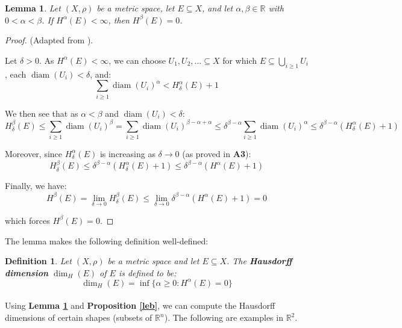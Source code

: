 \documentclass{article}[11pt]
\newcommand*{\R}{\mathbb{R}}
\DeclareMathOperator*{\diam}{diam}
\theoremstyle{dotless}
\newtheorem{lem}[thm]{Lemma}
\newtheorem{defn}[thm]{Definition}
\begin{document}
\begin{lem}\label{dim}
	Let $(X, \rho)$ be a metric space, let $E \subseteq X$, and let $\alpha, \beta \in \R$ with $0 < \alpha < \beta$.
	If $H^\alpha(E) < \infty$, then $H^\beta(E) = 0$.
\end{lem}
\begin{proof}
	(Adapted from \cite{Roy}).
	\bigskip
	
	\noindent
	Let $\delta > 0$. As $H^\alpha(E) < \infty$, we can choose $U_1, U_2, ... \subseteq X$ for which $E \subseteq \bigcup_{i \geqslant 1} U_i$,
	each $\diam(U_i) < \delta$, and:
	\[ \sum_{i \geqslant 1} \diam(U_i)^\alpha < H_\delta^\alpha(E) + 1  \]
	
	\noindent
	We then see that as $\alpha < \beta$ and $\diam(U_i) < \delta$:
	\[ H_\delta^\beta(E) \leqslant \sum_{i \geqslant 1} \diam(U_i)^\beta = \sum_{i \geqslant 1} \diam(U_i)^{\beta - \alpha + \alpha}
	\leqslant \delta^{\beta - \alpha} \sum_{i \geqslant 1} \diam(U_i)^\alpha
	\leqslant \delta^{\beta - \alpha} \left( H_\delta^\alpha(E) + 1 \right) \]
	
	\noindent
	Moreover, since $H_\delta^\alpha(E)$ is increasing as $\delta \to 0$ (as proved in \textbf{A3}):
	\[ H_\delta^\beta(E) \leqslant \delta^{\beta - \alpha} \left( H_\delta^\alpha(E) + 1 \right) \leqslant \delta^{\beta - \alpha} 
	\left( H^\alpha(E) + 1 \right) \]
	
	\noindent
	Finally, we have:
	\[ H^\beta(E) = \lim_{\delta \to 0} H_\delta^\beta(E) \leqslant \lim_{\delta \to 0} \delta^{\beta - \alpha} \left( H^\alpha(E) + 1 \right)
	= 0 \]
	
	\noindent
	which forces $H^\beta(E) = 0$.
\end{proof}

The lemma makes the following definition well-defined:

\begin{defn}
	Let $(X, \rho)$ be a metric space and let $E \subseteq X$. The \textbf{Hausdorff dimension} $\dim_H(E)$ of $E$ is defined to be:
	\[ \dim_H(E) = \inf \{ \alpha \geqslant 0 : H^\alpha(E) = 0 \} \]
\end{defn}

\paragraph{}
Using \textbf{Lemma \ref{dim}} and \textbf{Proposition \ref{leb}}, we can compute the Hausdorff dimensions of certain shapes
(subsets of $\R^n$). The following are examples in $\R^2$.
\end{document}

